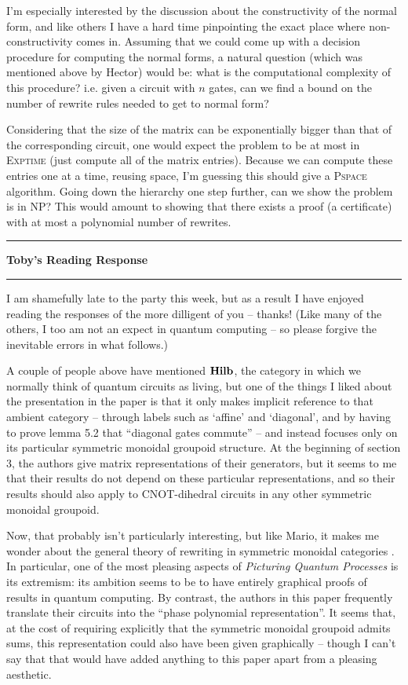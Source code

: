\documentclass{amsart}
\newcommand{\iam}[1]{
  \vspace{0.25em}
  \hrule
  \vspace{0.25em}
  \textbf{{#1}'s Reading Response}
  \vspace{0.25em}
  \hrule
  \vspace{1em}
}
\begin{document}
 I'm especially interested by the discussion about the constructivity of the normal form, and like others I have a hard time pinpointing the exact place where non-constructivity comes in.
 Assuming that we could come up with a decision procedure for computing the normal forms, a natural question (which was mentioned above by Hector) would be: what is the computational complexity of this procedure? i.e. given a circuit with $n$ gates, can we find a bound on the number of rewrite rules needed to get to normal form?

 Considering that the size of the matrix can be exponentially bigger than that of the corresponding circuit, one would expect the problem to be at most in \textsc{Exptime} (just compute all of the matrix entries). Because we can compute these entries one at a time, reusing space, I'm guessing this should give a \textsc{Pspace} algorithm. Going down the hierarchy one step further, can we show the problem is in \textsc{NP}? This would amount to showing that there exists a proof (a certificate) with at most a polynomial number of rewrites.

\iam{Toby}

I am shamefully late to the party this week, but as a result I have enjoyed reading the responses of the more dilligent of you -- thanks! (Like many of the others, I too am not an expect in quantum computing -- so please forgive the inevitable errors in what follows.)

A couple of people above have mentioned $\bf Hilb$, the category in which we normally think of quantum circuits as living, but one of the things I liked about the presentation in the paper is that it only makes implicit reference to that ambient category -- through labels such as `affine' and `diagonal', and by having to prove lemma 5.2 that ``diagonal gates commute'' -- and instead focuses only on its particular symmetric monoidal groupoid structure. At the beginning of section 3, the authors give matrix representations of their generators, but it seems to me that their results do not depend on these particular representations, and so their results should also apply to CNOT-dihedral circuits in any other symmetric monoidal groupoid.

Now, that probably isn't particularly interesting, but like Mario, it makes me wonder about the general theory of rewriting in symmetric monoidal categories \cite{RewritingSMC}. In particular, one of the most pleasing aspects of \textit{Picturing Quantum Processes} \cite{PQP} is its extremism: its ambition seems to be to have entirely graphical proofs of results in quantum computing. By contrast, the authors in this paper frequently translate their circuits into the ``phase polynomial representation''. It seems that, at the cost of requiring explicitly that the symmetric monoidal groupoid admits sums, this representation could also have been given graphically -- though I can't say that that would have added anything to this paper apart from a pleasing aesthetic.
\end{document}
